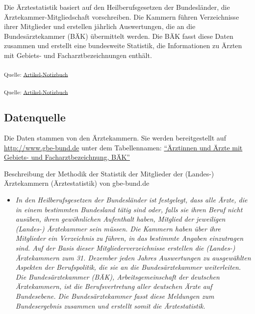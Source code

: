 \documentclass[
  ngerman,
  number,
  preprint,
  3p,
  twocolumn]{elsarticle}
\providecommand{\tightlist}{%
  \setlength{\itemsep}{0pt}\setlength{\parskip}{0pt}}
\begin{document}
Die Ärztestatistik basiert auf den Heilberufsgesetzen der Bundesländer,
die Ärztekammer-Mitgliedschaft vorschreiben. Die Kammern führen
Verzeichnisse ihrer Mitglieder und erstellen jährlich Auswertungen, die
an die Bundesärztekammer (BÄK) übermittelt werden. Die BÄK fasst diese
Daten zusammen und erstellt eine bundesweite Statistik, die
Informationen zu Ärzten mit Gebiets- und Facharztbezeichnungen enthält.

\textsubscript{Quelle:
\href{https://jakobschumacher.github.io/Update-Facharztmangel-im-oeffentlichen-Gesundheitsdienst/index.qmd.html}{Artikel-Notizbuch}}

\textsubscript{Quelle:
\href{https://jakobschumacher.github.io/Update-Facharztmangel-im-oeffentlichen-Gesundheitsdienst/index.qmd.html}{Artikel-Notizbuch}}

\subsection{Datenquelle}\label{datenquelle}

Die Daten stammen von den Ärztekammern. Sie werden bereitgestellt auf
\url{http://www.gbe-bund.de} unter dem Tabellennamen:
\href{http://www.gbe-bund.de/gbe10/express.prc_expr?p_aid=30416728&p_uid=gast&p_sprachkz=D&p_var=0&nummer=656&p_indsp=&p_ityp=H&p_hlpnr=3&p_lfd_nr=1&p_sprache=D&p_news=&p_janein=J}{``Ärztinnen
und Ärzte mit Gebiets- und Facharztbezeichnung, BÄK''}

Beschreibung der Methodik der Statistik der Mitglieder der (Landes-)
Ärztekammern (Ärztestatistik) von gbe-bund.de

\begin{itemize}
\tightlist
\item
  \emph{In den Heilberufsgesetzen der Bundesländer ist festgelegt, dass
  alle Ärzte, die in einem bestimmten Bundesland tätig sind oder, falls
  sie ihren Beruf nicht ausüben, ihren gewöhnlichen Aufenthalt haben,
  Mitglied der jeweiligen (Landes-) Ärztekammer sein müssen. Die Kammern
  haben über ihre Mitglieder ein Verzeichnis zu führen, in das bestimmte
  Angaben einzutragen sind. Auf der Basis dieser Mitgliederverzeichnisse
  erstellen die (Landes-) Ärztekammern zum 31. Dezember jeden Jahres
  Auswertungen zu ausgewählten Aspekten der Berufspolitik, die sie an
  die Bundesärztekammer weiterleiten. Die Bundesärztekammer (BÄK),
  Arbeitsgemeinschaft der deutschen Ärztekammern, ist die
  Berufsvertretung aller deutschen Ärzte auf Bundesebene. Die
  Bundesärztekammer fasst diese Meldungen zum Bundesergebnis zusammen
  und erstellt somit die Ärztestatistik.}
\end{itemize}
\end{document}
